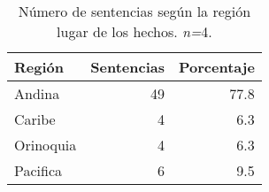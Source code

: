 \begin{table}[H]
\centering
\caption{Número de sentencias según la región lugar de los hechos. \textit{n=}4.} 
\label{tab:reghec}
\begin{tabular}{lrr}
  \hline
Región & Sentencias & Porcentaje \\ 
  \hline
Andina & 49 & 77.8 \\ 
  Caribe &  4 & 6.3 \\ 
  Orinoquia &  4 & 6.3 \\ 
  Pacifica &  6 & 9.5 \\ 
   \hline
\end{tabular}
\end{table}
